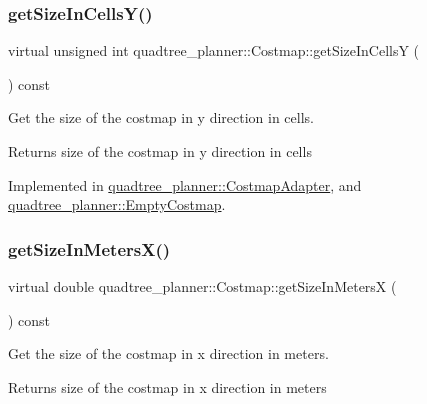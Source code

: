 \subsubsection{\texorpdfstring{get\+Size\+In\+Cells\+Y()}{getSizeInCellsY()}}
{\footnotesize\ttfamily virtual unsigned int quadtree\+\_\+planner\+::\+Costmap\+::get\+Size\+In\+CellsY (\begin{DoxyParamCaption}{ }\end{DoxyParamCaption}) const\hspace{0.3cm}{\ttfamily [pure virtual]}}



Get the size of the costmap in y direction in cells. 

\begin{DoxyReturn}{Returns}
size of the costmap in y direction in cells 
\end{DoxyReturn}


Implemented in \hyperlink{classquadtree__planner_1_1CostmapAdapter_a7d54b4b74b3057018408550c1116066e}{quadtree\+\_\+planner\+::\+Costmap\+Adapter}, and \hyperlink{classquadtree__planner_1_1EmptyCostmap_a2e3c5ddaaaee218d1cccf2a72dbe633f}{quadtree\+\_\+planner\+::\+Empty\+Costmap}.

\mbox{\label{classquadtree__planner_1_1Costmap_a86720bf9d3de86f59af0229d706763c1}} 
\subsubsection{\texorpdfstring{get\+Size\+In\+Meters\+X()}{getSizeInMetersX()}}
{\footnotesize\ttfamily virtual double quadtree\+\_\+planner\+::\+Costmap\+::get\+Size\+In\+MetersX (\begin{DoxyParamCaption}{ }\end{DoxyParamCaption}) const\hspace{0.3cm}{\ttfamily [pure virtual]}}



Get the size of the costmap in x direction in meters. 

\begin{DoxyReturn}{Returns}
size of the costmap in x direction in meters 
\end{DoxyReturn}


